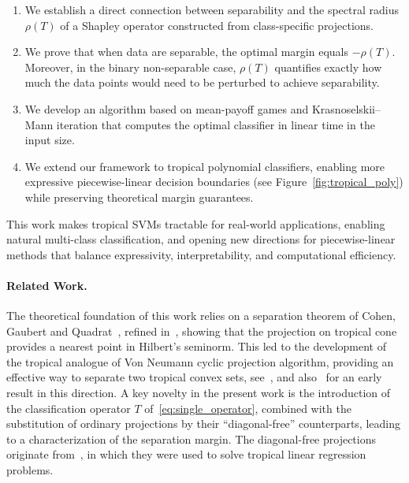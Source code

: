 \documentclass{article}
\begin{document}
\begin{enumerate}
    \item We establish a direct connection between separability and the spectral radius $\rho(T)$ of a Shapley operator constructed from class-specific projections.
    
    \item We prove that when data are separable, the optimal margin equals $-\rho(T)$. Moreover, in the binary non-separable case, $\rho(T)$ quantifies exactly how much the data points would need to be perturbed to achieve separability.
    
    \item We develop an algorithm based on mean-payoff games and Krasnoselskii--Mann iteration that computes the optimal classifier in linear time in the input size.
    
    \item We extend our framework to tropical polynomial classifiers, enabling more expressive piecewise-linear decision boundaries (see Figure~\ref{fig:tropical_poly}) while preserving theoretical margin guarantees.
\end{enumerate}

This work makes tropical SVMs tractable for real-world applications, enabling natural multi-class classification, and opening new directions for piecewise-linear methods that balance expressivity, interpretability, and computational efficiency.

\paragraph{Related Work.}
The theoretical foundation of this work relies on a separation theorem of Cohen, Gaubert and Quadrat~\cite{cohen2004}, refined in~\cite{AGNS10},  showing that the projection on tropical cone provides a nearest point in Hilbert's seminorm. This led to the development of the tropical
analogue of Von Neumann cyclic projection algorithm, providing an effective
way to separate two tropical convex sets, see~\cite{gaubert2011}, and also~\cite{CuninghameGreen2003} for an early result
in this direction. A key novelty in the present work is the introduction
of the classification operator $T$ of~\eqref{eq:single_operator}, combined
with the substitution of ordinary projections by their ``diagonal-free'' counterparts,
leading to a characterization of the separation margin. The diagonal-free projections
originate from~\cite{akiangaubertqisaadi},
in which they were used to solve tropical linear regression
problems.
\end{document}
